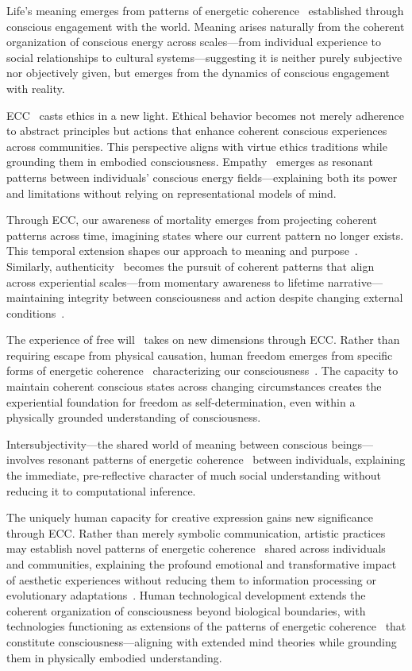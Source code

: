 Life's meaning emerges from patterns of energetic coherence~ established through conscious engagement with the world. Meaning arises naturally from the coherent organization of conscious energy across scales—from individual experience to social relationships to cultural systems—suggesting it is neither purely subjective nor objectively given, but emerges from the dynamics of conscious engagement with reality.

ECC~ casts ethics in a new light. Ethical behavior becomes not merely adherence to abstract principles but actions that enhance coherent conscious experiences across communities. This perspective aligns with virtue ethics traditions while grounding them in embodied consciousness. Empathy~ emerges as resonant patterns between individuals' conscious energy fields—explaining both its power and limitations without relying on representational models of mind.

Through ECC, our awareness of mortality emerges from projecting coherent patterns across time, imagining states where our current pattern no longer exists. This temporal extension shapes our approach to meaning and purpose~\cite{Ricoeur1984}. Similarly, authenticity~ becomes the pursuit of coherent patterns that align across experiential scales—from momentary awareness to lifetime narrative—maintaining integrity between consciousness and action despite changing external conditions~\cite{Taylor1991}.

The experience of free will~ takes on new dimensions through ECC. Rather than requiring escape from physical causation, human freedom emerges from specific forms of energetic coherence~ characterizing our consciousness~\cite{Sartre1956}. The capacity to maintain coherent conscious states across changing circumstances creates the experiential foundation for freedom as self-determination, even within a physically grounded understanding of consciousness. 

Intersubjectivity—the shared world of meaning between conscious beings—involves resonant patterns of energetic coherence~ between individuals, explaining the immediate, pre-reflective character of much social understanding without reducing it to computational inference.

The uniquely human capacity for creative expression gains new significance through ECC. Rather than merely symbolic communication, artistic practices may establish novel patterns of energetic coherence~ shared across individuals and communities, explaining the profound emotional and transformative impact of aesthetic experiences without reducing them to information processing or evolutionary adaptations~\cite{Cassirer1944}. Human technological development extends the coherent organization of consciousness beyond biological boundaries, with technologies functioning as extensions of the patterns of energetic coherence~ that constitute consciousness—aligning with extended mind theories while grounding them in physically embodied understanding.

